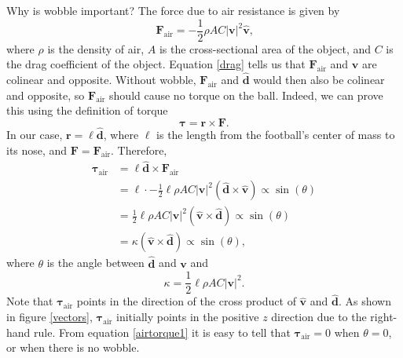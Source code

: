 \documentclass{article}
\begin{document}
Why is wobble important? The force due to air resistance is given by
\begin{equation}\label{drag}
    \mathbf{F}_{\text{air}} = -\frac{1}{2}\rho AC|\mathbf{v}|^2\mathbf{\hat{v}}\text{,}
\end{equation}
where $\rho$ is the density of air, $A$ is the cross-sectional area of the object, and $C$ is the drag coefficient of the object. Equation \ref{drag} tells us that $\mathbf{F}_{\text{air}}$ and $\mathbf{v}$ are colinear and opposite. Without wobble, $\mathbf{F}_{\text{air}}$ and $\mathbf{\hat{d}}$ would then also be colinear and opposite, so $\mathbf{F}_{\text{air}}$ should cause no torque on the ball. Indeed, we can prove this using the definition of torque
\begin{equation}\label{torque}
    \pmb{\tau} = \mathbf{r} \times \mathbf{F}\text{.}
\end{equation}
In our case, $\mathbf{r} = \ell\mathbf{\hat{d}}$, where $\ell$ is the length from the football's center of mass to its nose, and $\mathbf{F} = \mathbf{F}_{\text{air}}$. Therefore,
\begin{equation}\label{airtorque1}
    \begin{split}
        \pmb{\tau}_{\text{air}} &= \ell\mathbf{\hat{d}} \times \mathbf{F}_{\text{air}} \\
        &= \ell \cdot -\frac{1}{2}\ell\rho AC|\mathbf{v}|^2(\mathbf{\hat{d}} \times \mathbf{\hat{v}}) \propto \sin{(\theta)} \\
        &= \frac{1}{2}\ell\rho AC|\mathbf{v}|^2(\mathbf{\hat{v}} \times \mathbf{\hat{d}}) \propto \sin{(\theta)} \\
        &= \kappa(\mathbf{\hat{v}} \times \mathbf{\hat{d}}) \propto \sin{(\theta)}\text{,}
    \end{split}
\end{equation}
where $\theta$ is the angle between $\mathbf{\hat{d}}$ and $\mathbf{v}$ and
\begin{equation}
    \kappa = \frac{1}{2}\ell\rho AC|\mathbf{v}|^2\text{.}
\end{equation}
Note that $\pmb{\tau}_{\text{air}}$ points in the direction of the cross product of $\mathbf{\hat{v}}$ and $\mathbf{\hat{d}}$. As shown in figure \ref{vectors}, $\pmb{\tau}_{\text{air}}$ initially points in the positive $z$ direction due to the right-hand rule. From equation \ref{airtorque1} it is easy to tell that $\pmb{\tau}_{\text{air}} = 0$ when $\theta = 0$, or when there is no wobble.
\end{document}
